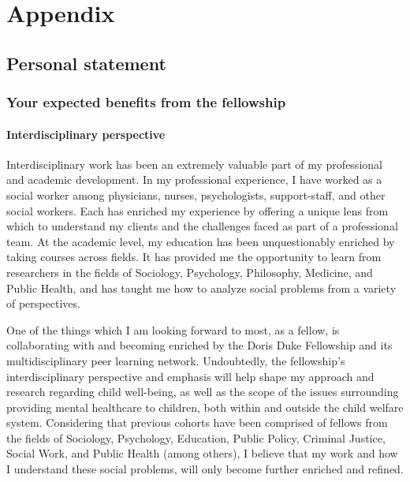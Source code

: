 \documentclass[twocolumn, issue, rga, authordate]{jote-new-article}
\begin{document}
\nocite{*}

\printbibliography
\license
\newpage
\section{Appendix}





\subsection{Personal statement}



\subsubsection{Your expected benefits from the fellowship}



\paragraph{Interdisciplinary perspective}


Interdisciplinary work has been an extremely valuable part of my
professional and academic development. In my professional experience, I
have worked as a social worker among physicians, nurses, psychologists,
support-staff, and other social workers. Each has enriched my experience
by offering a unique lens from which to understand my clients and the
challenges faced as part of a professional team. At the academic level,
my education has been unquestionably enriched by taking courses across
fields. It has provided me the opportunity to learn from researchers in
the fields of Sociology, Psychology, Philosophy, Medicine, and Public
Health, and has taught me how to analyze social problems from a variety
of perspectives.

One of the things which I am looking forward to most, as a fellow, is
collaborating with and becoming enriched by the Doris Duke Fellowship
and its multidisciplinary peer learning network. Undoubtedly, the
fellowship's interdisciplinary perspective and emphasis will help shape
my approach and research regarding child well-being, as well as the
scope of the issues surrounding providing mental healthcare to children,
both within and outside the child welfare system. Considering that
previous cohorts have been comprised of fellows from the fields of
Sociology, Psychology, Education, Public Policy, Criminal Justice,
Social Work, and Public Health (among others), I believe that my work
and how I understand these social problems, will only become further
enriched and refined.
\end{document}
